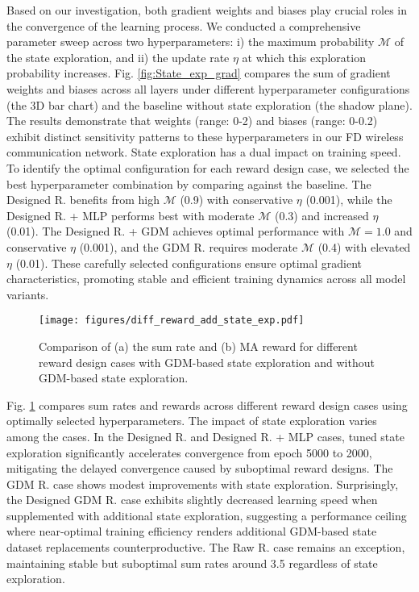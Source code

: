 \documentclass[comsoc,journal]{IEEEtran}
\begin{document}
Based on our investigation, both gradient weights and biases play crucial roles in the convergence of the learning process. We conducted a comprehensive parameter sweep across two hyperparameters: i) the maximum probability $\mathcal{M}$ of the state exploration, and ii) the update rate $\eta$ at which this exploration probability increases. Fig. \ref{fig:State_exp_grad} compares the sum of gradient weights and biases across all layers under different hyperparameter configurations (the 3D bar chart) and the baseline without state exploration (the shadow plane).  
The results demonstrate that weights (range: 0-2) and biases (range: 0-0.2) exhibit distinct sensitivity patterns to these hyperparameters in our FD wireless communication network. State exploration has a dual impact on training speed. To identify the optimal configuration for each reward design case, we selected the best hyperparameter combination by comparing against the baseline. The Designed R. benefits from high $\mathcal{M}$ (0.9) with conservative $\eta$ (0.001), while the Designed R. + MLP performs best with moderate $\mathcal{M}$ (0.3) and increased $\eta$ (0.01). The Designed R. + GDM achieves optimal performance with $\mathcal{M}=1.0$ and conservative $\eta$ (0.001), and the GDM R. requires moderate $\mathcal{M}$ (0.4) with elevated $\eta$ (0.01). These carefully selected configurations ensure optimal gradient characteristics, promoting stable and efficient training dynamics across all model variants.

\begin{figure}[t]
    \centering
    \texttt{[image: figures/diff\_reward\_add\_state\_exp.pdf]}
    \caption{Comparison of (a) the sum rate and (b) MA reward for different reward design cases with GDM-based state exploration and without GDM-based state exploration.
   }  
    \label{fig:state_exp_sumrate_reward}
\end{figure}
Fig. \ref{fig:state_exp_sumrate_reward} compares sum rates and rewards across different reward design cases using optimally selected hyperparameters. The impact of state exploration varies among the cases. In the Designed R. and Designed R. + MLP cases, tuned state exploration significantly accelerates convergence from epoch 5000 to 2000, mitigating the delayed convergence caused by suboptimal reward designs. The GDM R. case shows modest improvements with state exploration. Surprisingly, the Designed GDM R. case exhibits slightly decreased learning speed when supplemented with additional state exploration, suggesting a performance ceiling where near-optimal training efficiency renders additional GDM-based state dataset replacements counterproductive. The Raw R. case remains an exception, maintaining stable but suboptimal sum rates around 3.5 regardless of state exploration.
\end{document}
